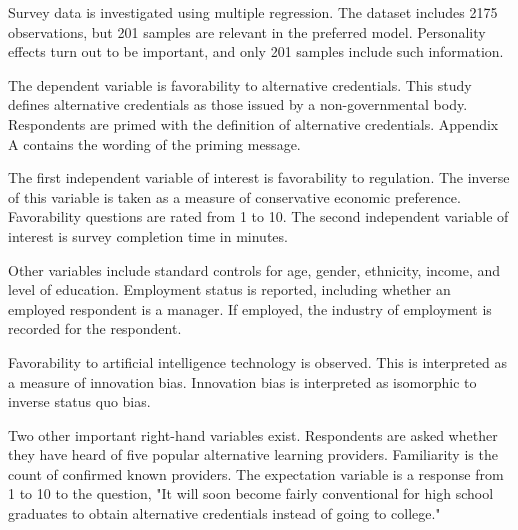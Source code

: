 \documentclass[review]{elsarticle}
\begin{document}
Survey data is investigated using multiple regression.
The dataset includes 2175 observations, but 201 samples are relevant in the preferred model.
Personality effects turn out to be important, and only 201 samples include such information.

The dependent variable is favorability to alternative credentials.
This study defines alternative credentials as those issued by a non-governmental body.
Respondents are primed with the definition of alternative credentials.
Appendix A contains the wording of the priming message.

The first independent variable of interest is favorability to regulation.
The inverse of this variable is taken as a measure of conservative economic preference.
Favorability questions are rated from 1 to 10.
The second independent variable of interest is survey completion time in minutes.

Other variables include standard controls for age,
gender, ethnicity, income, and level of education.
Employment status is reported, including whether an employed respondent is a manager.
If employed, the industry of employment is recorded for the respondent.

Favorability to artificial intelligence technology is observed.
This is interpreted as a measure of innovation bias.
Innovation bias is interpreted as isomorphic to inverse status quo bias.

Two other important right-hand variables exist.
Respondents are asked whether they have heard of five popular alternative learning providers.
Familiarity is the count of confirmed known providers.
The expectation variable is a response from 1 to 10 to the question,
"It will soon become fairly conventional for high school graduates to obtain alternative credentials instead of going to college."

%
\end{document}
